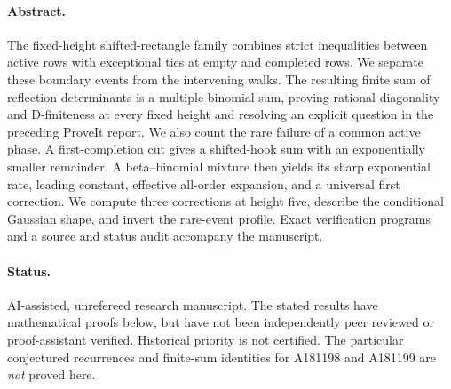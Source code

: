 \documentclass[11pt,letterpaper]{article}
\numberwithin{equation}{section}
\theoremstyle{definition}
\newcommand{\1}{\mathbf 1}
\begin{document}
\paragraph{Abstract.}
The fixed-height shifted-rectangle family combines strict inequalities
between active rows with exceptional ties at empty and completed rows.
We separate these boundary events from the intervening walks. The resulting
finite sum of reflection determinants is a multiple binomial sum, proving
rational diagonality and D-finiteness at every fixed height and resolving
an explicit question in the preceding ProveIt report. We also count the
rare failure of a common active phase. A first-completion cut gives a
shifted-hook sum with an exponentially smaller remainder. A beta--binomial
mixture then yields its sharp exponential rate, leading constant, effective
all-order expansion, and a universal first correction. We compute three
corrections at height five, describe the conditional Gaussian shape, and
invert the rare-event profile. Exact verification programs and a source
and status audit accompany the manuscript.

\paragraph{Status.} AI-assisted, unrefereed research manuscript.
The stated results have mathematical proofs below, but have not been
independently peer reviewed or proof-assistant verified. Historical priority
is not certified. The particular conjectured recurrences and finite-sum
identities for A181198 and A181199 are \emph{not} proved here.
\end{document}
